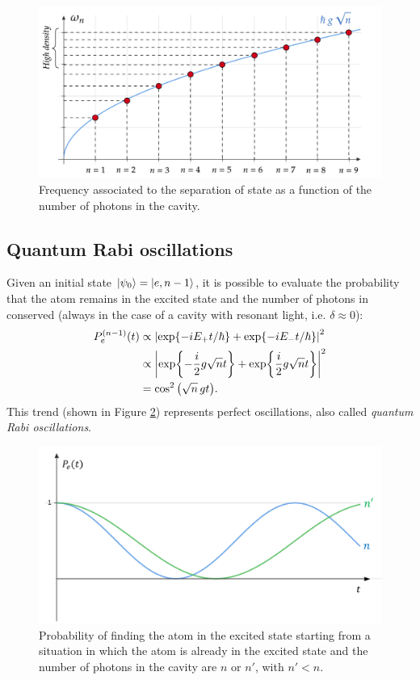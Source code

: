 \begin{figure}[h!]
\centering
    \includegraphics[width=0.8\linewidth]{images/omega_n.png}
    \caption{Frequency associated to the separation of state as a function of the number of photons in the cavity.}
    \label{fig:omegan}
\end{figure}

\subsection{Quantum Rabi oscillations}

Given an initial state $\ket{\psi_0} = \ket{e, n-1} $, it is possible to evaluate the probability that the atom remains in the excited state and the number of photons in conserved (always in the case of a cavity with resonant light, i.e. $\delta \approx 0$): 
\begin{align*}
    P_e^{(n-1)}(t) &\propto \abs{\exp{-iE_+ t/\hbar} + \exp{-iE_- t/\hbar}}^2  \\
    &\propto \abs{\exp{-\frac{i}{2} g \sqrt{n}t } + \exp{\frac{i}{2} g \sqrt{n}t }}^2  \\
    & = \cos^2{\left(\sqrt{n} \, g t\right)}. 
\end{align*}
This trend (shown in Figure \ref{fig:Pe}) represents perfect oscillations, also called \textit{quantum Rabi oscillations}.
\begin{figure}[t]
\centering
    \includegraphics[width=0.7\linewidth]{images/PeJC.png}
    \caption{Probability of finding the atom in the excited state starting from a situation in which the atom is already in the excited state and the number of photons in the cavity are $n$ or $n'$, with $n'<n$. }
    \label{fig:Pe}
\end{figure}

